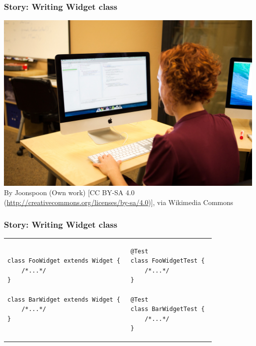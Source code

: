 \documentclass{beamer}
\begin{document}
\begin{frame}
  \frametitle{Story: Writing Widget class} {\small	
     \includegraphics[width=\textwidth, keepaspectratio=true]{images/Programmer_writing_code_with_Unit_Tests.jpg}
     \tiny
     \linebreak
     By Joonspoon (Own work) [CC BY-SA 4.0 (\url{http://creativecommons.org/licenses/by-sa/4.0})], via Wikimedia Commons
  }
\end{frame}

\begin{frame}[fragile]
  \frametitle{Story: Writing Widget class}
  {
     \begin{tabular}{ll}
        \begin{minipage}{0.4\textwidth}
\begin{lstlisting}[]
class FooWidget extends Widget { 
    /*...*/ 
}

class BarWidget extends Widget { 
    /*...*/ 
}
\end{lstlisting}
        \end{minipage}
        &
        \begin{minipage}{0.4\textwidth}
\begin{lstlisting}[]
@Test
class FooWidgetTest { 
    /*...*/ 
}

@Test
class BarWidgetTest { 
    /*...*/ 
}
\end{lstlisting}
        \end{minipage}
     \end{tabular}
  }
\end{frame}
\end{document}
